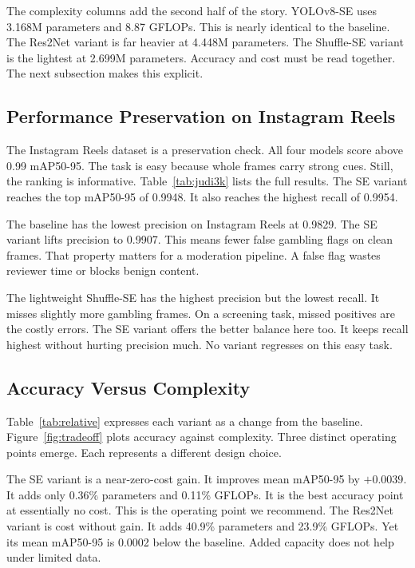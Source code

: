\documentclass[conference,a4paper]{IEEEtran}
\begin{document}


The complexity columns add the second half of the story. YOLOv8-SE uses
3.168M parameters and 8.87 GFLOPs. This is nearly identical to the baseline.
The Res2Net variant is far heavier at 4.448M parameters. The Shuffle-SE
variant is the lightest at 2.699M parameters. Accuracy and cost must be read
together. The next subsection makes this explicit.

\subsection{Performance Preservation on Instagram Reels}
The Instagram Reels dataset is a preservation check. All four models score above 0.99
mAP50-95. The task is easy because whole frames carry strong cues. Still, the
ranking is informative. Table~\ref{tab:judi3k} lists the full results. The SE
variant reaches the top mAP50-95 of 0.9948. It also reaches the highest recall
of 0.9954.



The baseline has the lowest precision on Instagram Reels at 0.9829. The SE variant lifts
precision to 0.9907. This means fewer false gambling flags on clean frames.
That property matters for a moderation pipeline. A false flag wastes reviewer
time or blocks benign content.

The lightweight Shuffle-SE has the highest precision but the lowest recall. It
misses slightly more gambling frames. On a screening task, missed positives are
the costly errors. The SE variant offers the better balance here too. It keeps
recall highest without hurting precision much. No variant regresses on this
easy task.

\subsection{Accuracy Versus Complexity}
Table~\ref{tab:relative} expresses each variant as a change from the
baseline. Figure~\ref{fig:tradeoff} plots accuracy against complexity. Three
distinct operating points emerge. Each represents a different design choice.



The SE variant is a near-zero-cost gain. It improves mean mAP50-95 by
$+0.0039$. It adds only 0.36\% parameters and 0.11\% GFLOPs. It is the best
accuracy point at essentially no cost. This is the operating point we
recommend. The Res2Net variant is cost without gain. It adds 40.9\%
parameters and 23.9\% GFLOPs. Yet its mean mAP50-95 is 0.0002 below the
baseline. Added capacity does not help under limited data.
\end{document}
